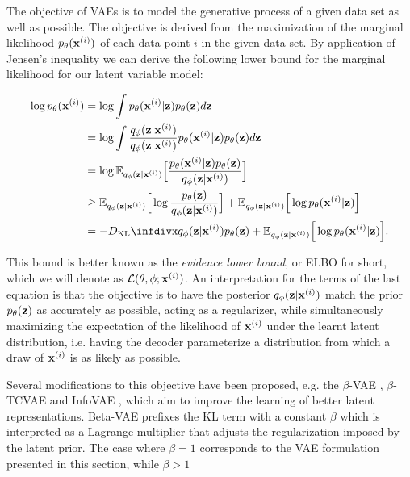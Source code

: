 
The objective of VAEs is to model the generative process of a given data set as well as possible. The objective is derived from the maximization of the marginal likelihood $p_{\theta}(\mathbf{x}^{(i)})$ of each data point $i$ in the given data set. By application of Jensen's inequality we can derive the following lower bound for the marginal likelihood for our latent variable model:

\begin{equation}
\begin{aligned}
\log \ptheta(\bxi) & = \log \int \ptheta(\bxi \vert \bz) \ptheta(\bz) d\bz \\
                   & = \log \int \frac{\qphi(\bz \vert \bxi)}{\qphi(\bz \vert \bxi)} \ptheta(\bxi \vert \bz) \ptheta(\bz) d\bz \\
                   & = \log \mathbb{E}_{\qphi(\bz \vert \bxi)}\Big[\frac{\ptheta(\bxi \vert \bz) \ptheta(\bz)}{\qphi(\bz \vert \bxi)}\Big] \\
                   & \geq \mathbb{E}_{\qphi(\bz \vert \bxi)}\Big[\log \frac{\ptheta(\bz)}{\qphi(\bz \vert \bxi)}\Big] + \mathbb{E}_{\qphi(\bz \vert \bxi)}\Big[\log \ptheta(\bxi \vert \bz)\Big] \\
                   & = -\dkl{\qphi(\bz \vert \bxi)}{\ptheta(\bz)} + \mathbb{E}_{\qphi(\bz \vert \bxi)}\Big[\log \ptheta(\bxi \vert \bz)\Big].
\end{aligned}
\end{equation}

This bound is better known as the \textit{evidence lower bound}, or ELBO for short, which we will denote as $\mathcal{L}(\theta, \phi; \mathbf{x}^{(i)})$. An interpretation for the terms of the last equation is that the objective is to have the posterior $q_{\phi}(\mathbf{z} \vert \mathbf{x}^{(i)})$ match the prior $p_{\theta}(\mathbf{z})$ as accurately as possible, acting as a regularizer, while simultaneously maximizing the expectation of the likelihood of $\mathbf{x}^{(i)}$ under the learnt latent distribution, i.e. having the decoder parameterize a distribution from which a draw of $\mathbf{x}^{(i)}$ is as likely as possible.

Several modifications to this objective have been proposed, e.g. the $\beta$-VAE \cite{beta_vae, understanding_beta_vae}, $\beta$-TCVAE \cite{beta_tcvae} and InfoVAE \cite{infovae}, which aim to improve the learning of better latent representations. Beta-VAE prefixes the KL term with a constant $\beta$ which is interpreted as a Lagrange multiplier that adjusts the regularization imposed by the latent prior. The case where $\beta = 1$ corresponds to the VAE formulation presented in this section, while $\beta > 1$ 

